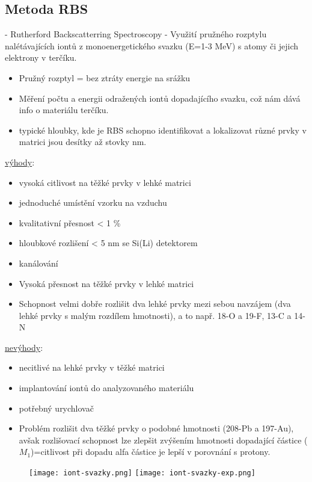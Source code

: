 \subsection{Metoda RBS}
- Rutherford Backscatterring Spectroscopy
- Využití pružného rozptylu nalétávajících iontů z monoenergetického svazku (E=1-3 MeV) s atomy či jejich elektrony v terčíku.
\begin{itemize}
    \item Pružný rozptyl = bez ztráty energie na srážku
    \item Měření počtu a energii odražených iontů dopadajícího svazku, což nám dává info o materiálu terčíku.
    \item typické hloubky, kde je RBS schopno identifikovat a lokalizovat různé prvky v matrici jsou desítky až stovky nm.
\end{itemize}


\underline{výhody}:
\begin{itemize}
\item vysoká citlivost na těžké prvky v lehké matrici
\item jednoduché umístění vzorku na vzduchu
\item kvalitativní přesnost < 1 \%
\item hloubkové rozlišení < 5 nm se Si(Li) detektorem
\item kanálování
\item Vysoká přesnost na těžké prvky v lehké matrici
\item Schopnost velmi dobře rozlišit dva lehké prvky mezi sebou navzájem (dva lehké prvky s malým rozdílem hmotnosti), a to např. 18-O a 19-F, 13-C a 14-N
\end{itemize}

\underline{nevýhody}:
\begin{itemize}
\item necitlivé na lehké prvky v těžké matrici
\item implantování iontů do analyzovaného materiálu
\item potřebný urychlovač
\item Problém rozlišit dva těžké prvky o podobné hmotnosti (208-Pb a 197-Au), avšak rozlišovací schopnost lze zlepšit zvýšením hmotnosti dopadající částice ($M_1$)=citlivost při dopadu alfa částice je lepší v porovnání s protony.
\end{itemize}

\begin{figure}[ht!]
	\texttt{[image: iont-svazky.png]}
	\texttt{[image: iont-svazky-exp.png]}
\end{figure}

